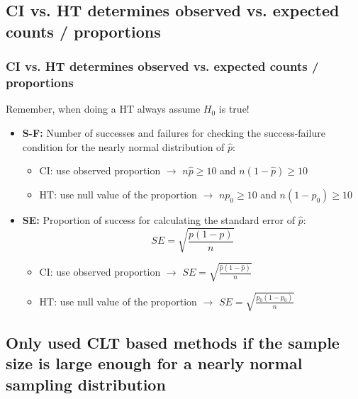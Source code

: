 \documentclass[slidestop,compress,mathserif,12pt,t,professionalfonts,xcolor=table]{beamer}
\begin{document}

\subsection{CI vs. HT determines observed vs. expected counts / proportions}
\label{mi3}


\begin{frame}
\frametitle{CI vs. HT determines observed vs. expected counts / proportions}

Remember, when doing a HT always assume $H_0$ is true!
\pause

\begin{itemize}

\item \textbf{S-F:} Number of successes and failures for checking the success-failure condition for the nearly normal distribution of $\hat{p}$:
\pause
\begin{itemize}
\item CI: use observed proportion $\rightarrow$ $n\hat{p} \ge 10$ and $n(1 - \hat{p}) \ge 10$
\pause
\item HT: use null value of the proportion $\rightarrow$ $np_0 \ge 10$ and $n(1 - p_0) \ge 10$
\end{itemize}

\pause

\item \textbf{SE:} Proportion of success for calculating the standard error of $\hat{p}$: 
\[ SE = \sqrt{\frac{p(1-p)}{n}} \]
\pause
\vspace{-0.5cm}
\begin{itemize}
\item CI: use observed proportion $\rightarrow$ $SE = \sqrt{\frac{\hat{p}(1-\hat{p})}{n}}$
\pause
\item HT: use null value of the proportion $\rightarrow$ $SE = \sqrt{\frac{p_0(1-p_0)}{n}}$
\end{itemize}

\end{itemize}


\end{frame}


\subsection{Only used CLT based methods if the sample size is large enough for a nearly normal sampling distribution}
\label{mi4}
\end{document}
